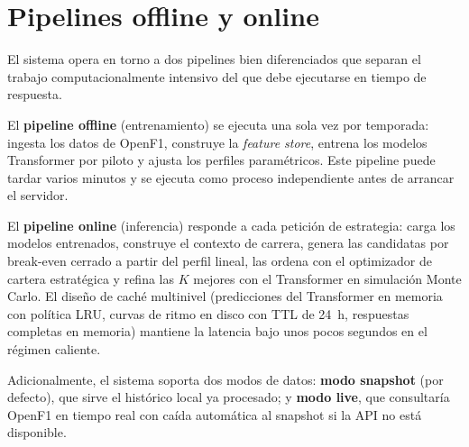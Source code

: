 \section{Pipelines offline y online}
\label{sec:pipelines}

El sistema opera en torno a dos pipelines bien diferenciados que separan el trabajo computacionalmente intensivo del que debe ejecutarse en tiempo de respuesta.

El \textbf{pipeline offline} (entrenamiento) se ejecuta una sola vez por temporada: ingesta los datos de OpenF1, construye la \textit{feature store}, entrena los modelos Transformer por piloto y ajusta los perfiles paramétricos. Este pipeline puede tardar varios minutos y se ejecuta como proceso independiente antes de arrancar el servidor.

El \textbf{pipeline online} (inferencia) responde a cada petición de estrategia: carga los modelos entrenados, construye el contexto de carrera, genera las candidatas por break-even cerrado a partir del perfil lineal, las ordena con el optimizador de cartera estratégica y refina las $K$ mejores con el Transformer en simulación Monte Carlo. El diseño de caché multinivel (predicciones del Transformer en memoria con política LRU, curvas de ritmo en disco con TTL de 24~h, respuestas completas en memoria) mantiene la latencia bajo unos pocos segundos en el régimen caliente.

Adicionalmente, el sistema soporta dos modos de datos: \textbf{modo snapshot} (por defecto), que sirve el histórico local ya procesado; y \textbf{modo live}, que consultaría OpenF1 en tiempo real con caída automática al snapshot si la API no está disponible.
